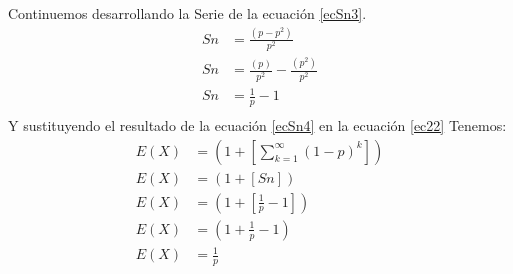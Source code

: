 \documentclass[12pt]{article}
\begin{document}
Continuemos desarrollando la Serie de la ecuación \ref{ecSn3}.\\
\begin{equation}\label{ecSn4}
\begin{split}
Sn  & = \frac{(p-p^2)}{p^2}\\
Sn  & = \frac{(p)}{p^2} - \frac{(p^2)}{p^2}\\
Sn  & = \frac{1}{p} - 1\\
\end{split}
\end{equation}
Y sustituyendo el resultado de la ecuación \ref{ecSn4} en la ecuación \ref{ec22} Tenemos:\\
\begin{equation}\label{ecFnt}
\begin{split}
E(X)  &= (1 + [\sum_{k=1}^{\infty}{(1 - p)^{k}}])\\
E(X)  &= (1 + [Sn])\\
E(X)  &= (1 + [\frac{1}{p} - 1])\\
E(X)  &= (1 + \frac{1}{p} - 1)\\
E(X)  &= \frac{1}{p}\\
\end{split}
\end{equation}
\end{document}
